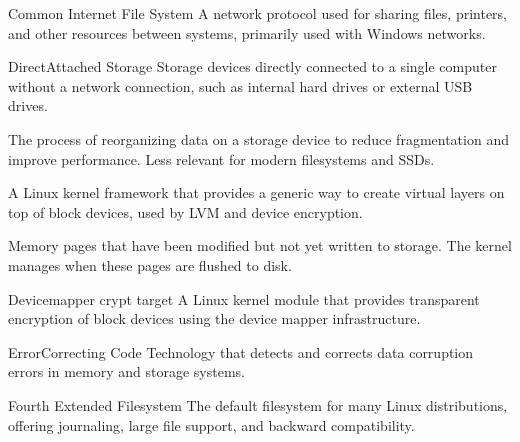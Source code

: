 \documentclass[letterpaper,10pt,english]{sphinxmanual}
\begin{document}
\begin{description}
\sphinxAtStartPar
Common Internet File System \sphinxhyphen{} A network protocol used for sharing files, printers, and other resources between systems, primarily used with Windows networks.

\sphinxAtStartPar
Direct\sphinxhyphen{}Attached Storage \sphinxhyphen{} Storage devices directly connected to a single computer without a network connection, such as internal hard drives or external USB drives.

\sphinxAtStartPar
The process of reorganizing data on a storage device to reduce fragmentation and improve performance. Less relevant for modern filesystems and SSDs.

\sphinxAtStartPar
A Linux kernel framework that provides a generic way to create virtual layers on top of block devices, used by LVM and device encryption.

\sphinxAtStartPar
Memory pages that have been modified but not yet written to storage. The kernel manages when these pages are flushed to disk.

\sphinxAtStartPar
Device\sphinxhyphen{}mapper crypt target \sphinxhyphen{} A Linux kernel module that provides transparent encryption of block devices using the device mapper infrastructure.

\sphinxAtStartPar
Error\sphinxhyphen{}Correcting Code \sphinxhyphen{} Technology that detects and corrects data corruption errors in memory and storage systems.

\sphinxAtStartPar
Fourth Extended Filesystem \sphinxhyphen{} The default filesystem for many Linux distributions, offering journaling, large file support, and backward compatibility.


\end{description}
\end{document}
